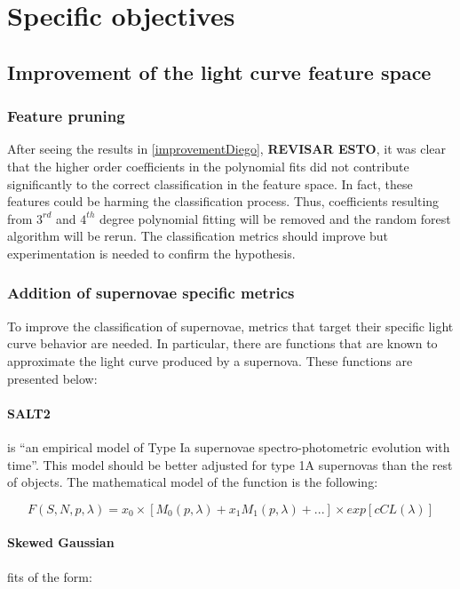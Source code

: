 \section{Specific objectives}

\subsection{Improvement of the light curve feature space}

\subsubsection{Feature pruning}

After seeing the results in \ref{improvementDiego}, \textbf{REVISAR ESTO}, it was clear that the higher order coefficients in the polynomial fits did not contribute significantly to the correct classification in the feature space. In fact, these features could be harming the classification process. Thus, coefficients resulting from $3^{rd}$ and $4^{th}$ degree polynomial fitting will be removed and the random forest algorithm will be rerun. The classification metrics should improve but experimentation is needed to confirm the hypothesis.  

\subsubsection{Addition of supernovae specific metrics}

To improve the classification of supernovae, metrics that target their specific light curve behavior are needed. In particular, there are functions that are known to approximate the light curve produced by a supernova. These functions are presented below: 

\paragraph{SALT2} is ``an empirical model of Type Ia supernovae spectro-photometric evolution with time''\cite{salt2}. This model should be better adjusted for type 1A supernovas than the rest of objects. The mathematical model of the function is the following\cite{salt2}:

\[
  F(S,N,p,\lambda) = x_0 \times [M_0(p,\lambda)+x_1M_1(p,\lambda)+...]\times exp[cCL(\lambda)]
\]

\paragraph{Skewed Gaussian} fits of the form:

